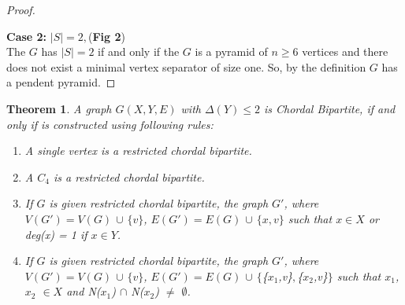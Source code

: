 \documentclass[11pt]{article}
\newtheorem{theorem}{Theorem}
\begin{document}
\begin{proof}
\begin{center}
	\end{center}
	
	\textbf{Case 2:} $|S| = 2,$(\textbf{Fig 2})\\
	The $G$ has $|S| = 2$ if and only if the $G$ is a pyramid of $n \geq 6$ vertices and there does not exist a minimal vertex separator of size one. So, by the definition $G$ has a pendent pyramid.
\end{proof}
%
%
	\begin{theorem} \label{construction rules}
	A graph $ G(X,Y,E)$ with $\Delta(Y) \leq 2$ is Chordal Bipartite, if and only if is constructed using following rules:
	
	\begin{enumerate}[label=(\roman*)]
	
	\item A single vertex is a restricted chordal bipartite.
	
	\item A $ C_{4}$ is a restricted chordal bipartite.
	
	\item If $ G $ is given restricted chordal bipartite, the graph $ G' $, where $ V(G') = V(G) $ $\cup$ $\lbrace v \rbrace$, $ E(G') = E(G) $ $\cup$ $\lbrace x,v \rbrace$ such that $x \in X$ or deg(x) = 1 if $x \in Y $.
	
	\item If $ G $ is given restricted chordal bipartite, the graph $ G' $, where $ V(G') = V(G) $ $\cup$ $\lbrace v \rbrace$, $ E(G') = E(G) $ $\cup$ $\Big\{ $\big\{$x_{1}$,v\big\}$, $\big\{$x_{2}$,v\big\}$ \Big\}$ such that $x_{1}$,$x_{2}$ $\in X$ and N($x_{1}$) $\cap$ N($x_{2}$) $\neq$ $\emptyset$.
	\end{enumerate}
	\end{theorem}
		
\end{document}

